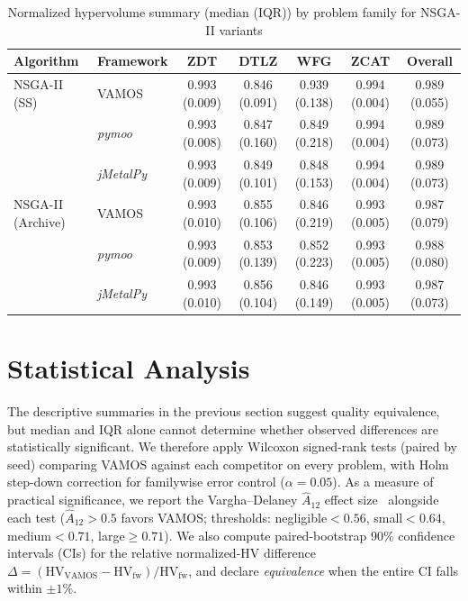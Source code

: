 \documentclass[journal]{IEEEtran}
\newcommand{\VAMOS}{VAMOS}
\newcommand{\HV}{\mathrm{HV}}
\begin{document}
\begin{table}[htbp]
\centering
\caption{Normalized hypervolume summary (median (IQR)) by problem family for NSGA-II variants}
\label{tab:frameworks_hv_variants}
\begin{tabular}{@{}llccccc@{}}
\toprule
\textbf{Algorithm} & \textbf{Framework} & \textbf{ZDT} & \textbf{DTLZ} & \textbf{WFG} & \textbf{ZCAT} & \textbf{Overall} \\
\midrule
NSGA-II (SS) & VAMOS & 0.993 (0.009) & 0.846 (0.091) & 0.939 (0.138) & 0.994 (0.004) & 0.989 (0.055) \\
 & \textit{pymoo}  & 0.993 (0.008) & 0.847 (0.160) & 0.849 (0.218) & 0.994 (0.004) & 0.989 (0.073) \\
 & \textit{jMetalPy} & 0.993 (0.009) & 0.849 (0.101) & 0.848 (0.153) & 0.994 (0.004) & 0.989 (0.073) \\
\midrule
NSGA-II (Archive) & VAMOS & 0.993 (0.010) & 0.855 (0.106) & 0.846 (0.219) & 0.993 (0.005) & 0.987 (0.079) \\
 & \textit{pymoo}  & 0.993 (0.009) & 0.853 (0.139) & 0.852 (0.223) & 0.993 (0.005) & 0.988 (0.080) \\
 & \textit{jMetalPy} & 0.993 (0.010) & 0.856 (0.104) & 0.846 (0.149) & 0.993 (0.005) & 0.987 (0.073) \\
\bottomrule
\end{tabular}
\end{table}

%

\section{Statistical Analysis}
\label{app:stats_main}

The descriptive summaries in the previous section suggest quality equivalence, but median and IQR alone cannot determine whether observed differences are statistically significant. We therefore apply Wilcoxon signed-rank tests (paired by seed) comparing \VAMOS{} against each competitor on every problem, with Holm step-down correction for familywise error control ($\alpha=0.05$). As a measure of practical significance, we report the Vargha--Delaney $\hat{A}_{12}$ effect size~\cite{VD00} alongside each test ($\hat{A}_{12}>0.5$ favors \VAMOS{}; thresholds: negligible${}<0.56$, small${}<0.64$, medium${}<0.71$, large${\ge}0.71$). We also compute paired-bootstrap 90\% confidence intervals (CIs) for the relative normalized-HV difference $\Delta = (\HV_{\text{VAMOS}} - \HV_{\text{fw}})/\HV_{\text{fw}}$, and declare \emph{equivalence} when the entire CI falls within $\pm 1\%$.
\end{document}
